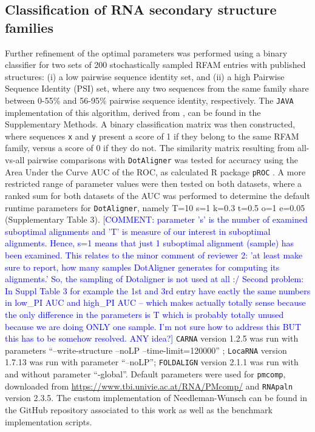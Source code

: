 \documentclass{bmcart}
\newcommand\dotaligner{\texttt{DotAligner}}
\newcommand\locarna{\texttt{LocaRNA}}
\newcommand\foldalign{\texttt{FOLDALIGN}}
\newcommand\carna{\texttt{CARNA}}
\begin{document}
\subsection*{Classification of RNA secondary structure families}
Further refinement of the optimal parameters was performed using a binary classifier for two sets of 
200 stochastically sampled RFAM entries with published structures: 
(i) a low pairwise sequence identity set, and (ii) a high Pairwise Sequence Identity (PSI) set, 
where any two sequences from the same family share between 0-55\% and 56-95\% pairwise sequence identity, respectively. The \texttt{JAVA} implementation of this algorithm, derived from \cite{smith2013widespread}, can be found in the Supplementary Methods. 
A binary classification matrix was then constructed, where sequences \texttt{x} and \texttt{y}
present a score of 1 if they belong to the same RFAM family, versus a score of 0 if they do not. 
The similarity matrix resulting from all-vs-all pairwise comparisons with \dotaligner{} was tested for 
accuracy using the Area Under the Curve AUC of the ROC, as calculated R package \texttt{pROC} \cite{robin2011proc}. 
A more restricted range of parameter values were then tested on both datasets, where a ranked sum for both datasets of the AUC was performed to determine the default runtime parameters for \dotaligner{}, namely T=10 s=1 k=0.3 t=0.5 o=1 e=0.05 (Supplementary Table 3). \textcolor{blue}{[COMMENT: parameter 's' is the number of examined suboptimal alignments and 'T' is measure of our interest in suboptimal alignments. Hence, s=1 means that just 1 suboptimal alignment (sample) has been examined. This relates to the minor comment of reviewer 2: 'at least make sure to report, how many samples DotAligner generates for computing its alignments.' So, the sampling of Dotaligner is not used at all :/ Second problem: In Suppl Table 3 for example the 1st and 3rd entry have eactly the same numbers in low\_PI AUC and high\_PI AUC -- which makes actually totally sense because the only difference in the parameters is T which is probably totally unused because we are doing ONLY one sample. I'm not sure how to address this BUT this has to be somehow resolved. ANY idea?]} \carna{} version 1.2.5 was run with parameters ``--write-structure --noLP --time-limit=120000'' ;  \locarna{} version 1.7.13 was run with parameter ``--noLP''; \foldalign{} version 2.1.1 was run with and without parameter ``-global''. Default parameters were used for \texttt{pmcomp}, downloaded from \url{https://www.tbi.univie.ac.at/RNA/PMcomp/} and \texttt{RNApaln} version 2.3.5. The custom implementation of Needleman-Wunsch can be found in the GitHub repository associated to this work as well as the benchmark implementation scripts. \\
\end{document}

